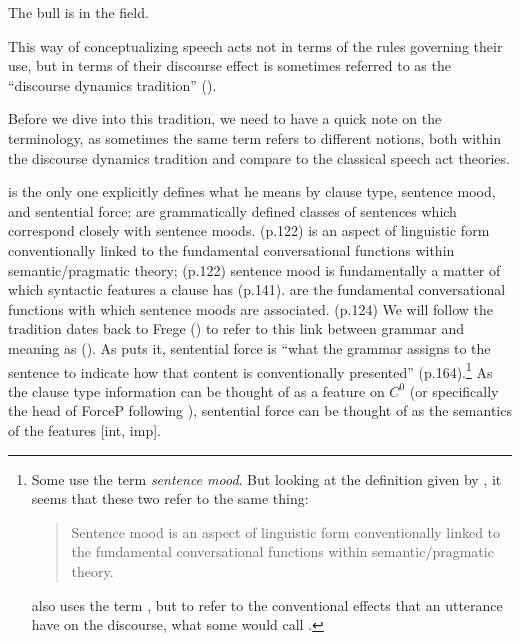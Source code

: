 The bull is in the field.
\eex

This way of conceptualizing speech acts not in terms of the rules governing their use, but in terms of their discourse effect is sometimes referred to as the “discourse dynamics tradition” (\cite{murraystarr2020}). 

Before we dive into this tradition, we need to have a quick note on the terminology, as sometimes the same term refers to different notions, both within the discourse dynamics tradition and compare to the classical speech act theories. 

\textcite{portner2018} is the only one explicitly defines what he means by clause type, sentence mood, and sentential force: 
\bxl
{} are grammatically defined classes of sentences which correspond closely with sentence moods. (p.122)
\ex{} is an aspect of linguistic form conventionally linked to the fundamental conversational functions within semantic/pragmatic theory; (p.122) sentence mood is fundamentally a matter of which syntactic features a clause has (p.141). 
\ex {} are the fundamental conversational functions with which sentence moods are associated. (p.124)
\exl
\eex
We will follow the tradition dates back to Frege (\cite{frege1918thought}) to refer to this link between grammar and meaning as  (\cite{chierchia1990textbook}). As \textcite{chierchia1990textbook} puts it, sentential force is ``what the grammar assigns to the sentence to indicate how that content is conventionally presented'' (p.164).\footnote{Some use the term \emph{sentence mood}. But looking at the definition given by \textcite{portner2018}, it seems that these two refer to the same thing:
\begin{quote}
Sentence mood is an aspect of linguistic form conventionally linked to the fundamental conversational functions within semantic/pragmatic theory.\\
\hspace*{\fill} \hfill \textcite[p.122]{portner2018}
\end{quote}
\cite{portner2018} also uses the term , but to refer to the conventional effects that an utterance have on the discourse, what some would call . 
} As the clause type information can be thought of as a feature on $C^{0}$ (or specifically the head of ForceP following \cite{rizzi1997}), sentential force can be thought of as the semantics of the features [\textpm int, \textpm imp].


